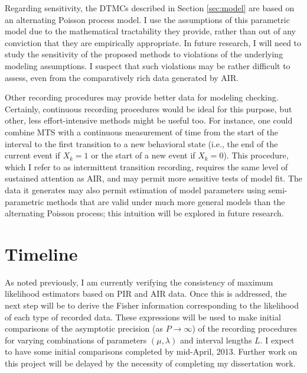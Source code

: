 \documentclass[11pt]{article}
\begin{document}
Regarding sensitivity, the DTMCs described in Section \ref{sec:model} are based on an alternating Poisson process model. I use the assumptions of this parametric model due to the mathematical tractability they provide, rather than out of any conviction that they are empirically appropriate. In future research, I will need to study the sensitivity of the proposed methods to violations of the underlying modeling assumptions. I suspect that such violations may be rather difficult to assess, even from the comparatively rich data generated by AIR. 

Other recording procedures may provide better data for modeling checking. Certainly, continuous recording procedures would be ideal for this purpose, but other, less effort-intensive methods might be useful too. For instance, one could combine MTS with a continuous measurement of time from the start of the interval to the first transition to a new behavioral state (i.e., the end of the current event if $X_k = 1$ or the start of a new event if $X_k = 0$). This procedure, which I refer to as intermittent transition recording, requires the same level of sustained attention as AIR, and may permit more sensitive tests of model fit. The data it generates may also permit estimation of model parameters using semi-parametric methods that are valid under much more general models than the alternating Poisson process; this intuition will be explored in future research. 

\section{Timeline}

As noted previously, I am currently verifying the consistency of maximum likelihood estimators based on PIR and AIR data. Once this is addressed, the next step will be to derive the Fisher information corresponding to the likelihood of each type of recorded data. These expressions will be used to make initial comparisons of the asymptotic precision (as $P \to \infty$) of the recording procedures for varying combinations of parameters $(\mu,\lambda)$ and interval lengths $L$. I expect to have some initial comparisons completed by mid-April, 2013. Further work on this project will be delayed by the necessity of completing my dissertation work. 

\pagebreak
\renewcommand\refname{\begin{centering}References\end{centering}}


%
\end{document}
